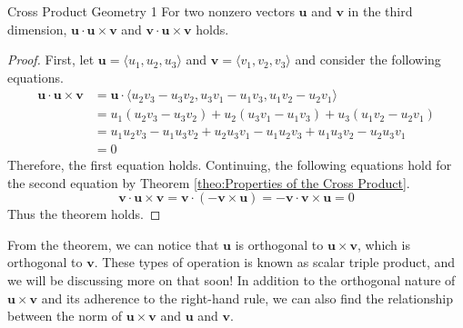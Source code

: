 \documentclass[../../main.tex]{subfiles}
\begin{document}
\begin{theorem}{}{Cross Product Geometry 1}
For two nonzero vectors $\mathbf{u}$ and $\mathbf{v}$ in the third
dimension, $\mathbf{u} \cdot \mathbf{u} \times \mathbf{v}$ and
$\mathbf{v} \cdot \mathbf{u} \times \mathbf{v}$ holds.
\end{theorem}
\begin{proof}
First, let $\mathbf{u} = \langle u_1, u_2, u_3 \rangle$ and
$\mathbf{v} = \langle v_1, v_2, v_3 \rangle$ and consider the
following equations.
\begin{align*}
    \mathbf{u} \cdot \mathbf{u} \times \mathbf{v} 
    &= \mathbf{u} \cdot \langle
        u_2v_3 - u_3v_2, u_3v_1 - u_1v_3, u_1v_2 - u_2v_1
    \rangle \\
    &= u_1 (u_2v_3 - u_3v_2) + u_2 (u_3v_1 - u_1v_3)
        + u_3 (u_1v_2 - u_2v_1) \\
    &= u_1u_2v_3 - u_1u_3v_2 + u_2u_3v_1 - u_1u_2v_3
        + u_1u_3v_2 - u_2u_3v_1 \\
    &= 0
\end{align*}
Therefore, the first equation holds. Continuing, the following
equations hold for the second equation by Theorem \ref{theo:Properties
of the Cross Product}.
\[
\mathbf{v} \cdot \mathbf{u} \times \mathbf{v}
= \mathbf{v} \cdot (-\mathbf{v} \times \mathbf{u})
= - \mathbf{v} \cdot \mathbf{v} \times \mathbf{u}
= 0
\]
Thus the theorem holds.
\end{proof}

From the theorem, we can notice that $\mathbf{u}$ is orthogonal
to $\mathbf{u} \times \mathbf{v}$, which is orthogonal to
$\mathbf{v}$. These types of operation is known as scalar
triple product, and we will be discussing more on that soon!
In addition to the orthogonal nature of $\mathbf{u} \times \mathbf{v}$
and its adherence to the right-hand rule, we can also find the
relationship between the norm of $\mathbf{u} \times \mathbf{v}$
and $\mathbf{u}$ and $\mathbf{v}$.
\end{document}
